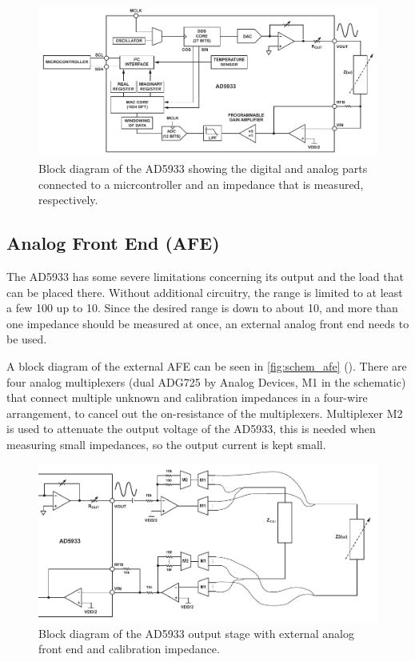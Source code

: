 \begin{figure}[htpb]
  \centering
    \includegraphics[width=\textwidth]{bilder/ad_block.pdf}
  \caption{Block diagram of the AD5933 showing the digital and analog parts connected to a micrcontroller
    and an impedance that is measured, respectively.}
  \label{fig:ad_block}
\end{figure}


\subsection{Analog Front End (AFE)}

The AD5933 has some severe limitations concerning its output and the load that can be placed there. Without additional
circuitry, the range is limited to at least a few \unit{100}{\kilo\ohm} up to \unit{10}{\mega\ohm}.
Since the desired range is down to about \unit{10}{\ohm}, and more than one impedance should be measured at once,
an external analog front end needs to be used.

A block diagram of the external AFE can be seen in \autoref{fig:schem_afe} ().
There are four analog multiplexers (dual ADG725 by Analog Devices, M1 in the schematic) that connect multiple unknown
and calibration impedances in a four-wire arrangement, to cancel out the on-resistance of the multiplexers.
Multiplexer M2 is used to attenuate the output voltage of the AD5933, this is needed when measuring small impedances,
so the output current is kept small.

\begin{figure}[hpb]
  \centering
    \includegraphics[width=\textwidth]{bilder/schem_afe.pdf}
  \caption{Block diagram of the AD5933 output stage with external analog front end and calibration impedance.}
  \label{fig:schem_afe}
\end{figure}